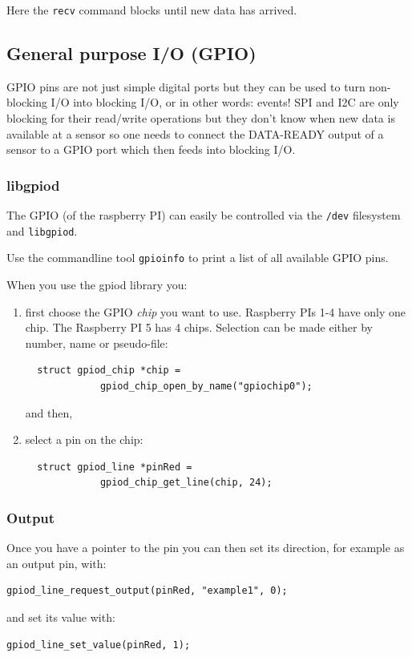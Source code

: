 \documentclass[12pt]{report}
\begin{document}
Here the \texttt{recv} command blocks until new data has arrived.





\subsection{General purpose I/O (GPIO)}
GPIO pins are not just simple digital ports but they
can be used to turn non-blocking I/O into blocking I/O, or in other words: events!
SPI and I2C are only blocking for their read/write operations but they don't know
when new data is available at a sensor so one needs to connect the DATA-READY output
of a sensor to a GPIO port which then feeds into blocking I/O.

\subsubsection{libgpiod}
The GPIO (of the raspberry PI) can easily be controlled via
the \texttt{/dev} filesystem and \texttt{libgpiod}.

Use the commandline tool
\texttt{gpioinfo} to print a list of all available GPIO pins.

When you use the gpiod library you:
\begin{enumerate}
\item first choose the GPIO \textsl{chip} you want to use. Raspberry PIs 1-4
  have only one chip. The Raspberry PI 5 has 4 chips.
  Selection can be made either by number, name or pseudo-file:
\begin{verbatim}
  struct gpiod_chip *chip = 
             gpiod_chip_open_by_name("gpiochip0");
\end{verbatim}
and then,
\item select a pin on the chip:
\begin{verbatim}
  struct gpiod_line *pinRed =
             gpiod_chip_get_line(chip, 24);
\end{verbatim}
\end{enumerate}

\subsubsection{Output}
Once you have a pointer to the pin you can then set its direction, for example
as an output pin, with:
\begin{verbatim}
gpiod_line_request_output(pinRed, "example1", 0);
\end{verbatim}
and set its value with:
\begin{verbatim}
gpiod_line_set_value(pinRed, 1);
\end{verbatim}
\end{document}
